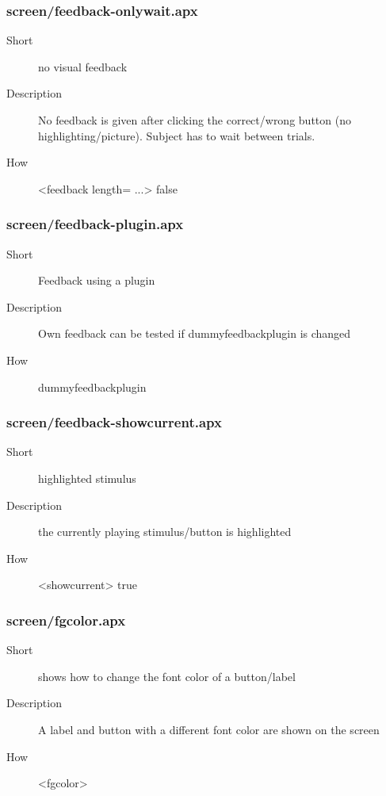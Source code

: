 \subsubsection{screen/feedback-onlywait.apx}
\begin{description}
\item[Short] 
 no visual feedback
\item[Description] 
 No feedback is given after clicking the correct/wrong button (no highlighting/picture). Subject has to wait between trials.
\item[How] 
 \textless{}feedback length= ...\textgreater{} false
\end{description}

\subsubsection{screen/feedback-plugin.apx}
\begin{description}
\item[Short] 
 Feedback using a plugin
\item[Description] 
 Own feedback can be tested if dummyfeedbackplugin is changed
\item[How] 
 dummyfeedbackplugin
\end{description}

\subsubsection{screen/feedback-showcurrent.apx}
\begin{description}
\item[Short] 
 highlighted stimulus
\item[Description] 
 the currently playing stimulus/button is highlighted
\item[How] 
 \textless{}showcurrent\textgreater{} true
\end{description}

\subsubsection{screen/fgcolor.apx}
\begin{description}
\item[Short] 
 shows how to change the font color of a button/label
\item[Description] 
 A label and button with a different font color are shown on the screen
\item[How] 
 \textless{}fgcolor\textgreater{}
\end{description}

